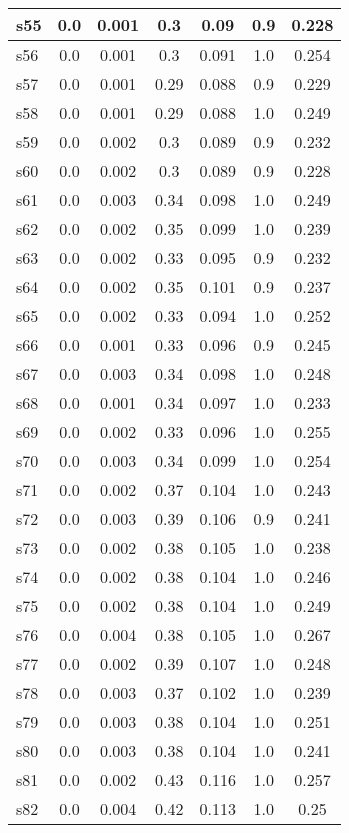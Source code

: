 \documentclass{article}
\begin{document}
\begin{tabular}{|l|c|c|c|c|c|c|}
\hline
s55 &0.0 & 0.001 & 0.3 & 0.09 & 0.9 & 0.228\\
\hline
s56 &0.0 & 0.001 & 0.3 & 0.091 & 1.0 & 0.254\\
\hline
s57 &0.0 & 0.001 & 0.29 & 0.088 & 0.9 & 0.229\\
\hline
s58 &0.0 & 0.001 & 0.29 & 0.088 & 1.0 & 0.249\\
\hline
s59 &0.0 & 0.002 & 0.3 & 0.089 & 0.9 & 0.232\\
\hline
s60 &0.0 & 0.002 & 0.3 & 0.089 & 0.9 & 0.228\\
\hline
s61 &0.0 & 0.003 & 0.34 & 0.098 & 1.0 & 0.249\\
\hline
s62 &0.0 & 0.002 & 0.35 & 0.099 & 1.0 & 0.239\\
\hline
s63 &0.0 & 0.002 & 0.33 & 0.095 & 0.9 & 0.232\\
\hline
s64 &0.0 & 0.002 & 0.35 & 0.101 & 0.9 & 0.237\\
\hline
s65 &0.0 & 0.002 & 0.33 & 0.094 & 1.0 & 0.252\\
\hline
s66 &0.0 & 0.001 & 0.33 & 0.096 & 0.9 & 0.245\\
\hline
s67 &0.0 & 0.003 & 0.34 & 0.098 & 1.0 & 0.248\\
\hline
s68 &0.0 & 0.001 & 0.34 & 0.097 & 1.0 & 0.233\\
\hline
s69 &0.0 & 0.002 & 0.33 & 0.096 & 1.0 & 0.255\\
\hline
s70 &0.0 & 0.003 & 0.34 & 0.099 & 1.0 & 0.254\\
\hline
s71 &0.0 & 0.002 & 0.37 & 0.104 & 1.0 & 0.243\\
\hline
s72 &0.0 & 0.003 & 0.39 & 0.106 & 0.9 & 0.241\\
\hline
s73 &0.0 & 0.002 & 0.38 & 0.105 & 1.0 & 0.238\\
\hline
s74 &0.0 & 0.002 & 0.38 & 0.104 & 1.0 & 0.246\\
\hline
s75 &0.0 & 0.002 & 0.38 & 0.104 & 1.0 & 0.249\\
\hline
s76 &0.0 & 0.004 & 0.38 & 0.105 & 1.0 & 0.267\\
\hline
s77 &0.0 & 0.002 & 0.39 & 0.107 & 1.0 & 0.248\\
\hline
s78 &0.0 & 0.003 & 0.37 & 0.102 & 1.0 & 0.239\\
\hline
s79 &0.0 & 0.003 & 0.38 & 0.104 & 1.0 & 0.251\\
\hline
s80 &0.0 & 0.003 & 0.38 & 0.104 & 1.0 & 0.241\\
\hline
s81 &0.0 & 0.002 & 0.43 & 0.116 & 1.0 & 0.257\\
\hline
s82 &0.0 & 0.004 & 0.42 & 0.113 & 1.0 & 0.25\\

\end{tabular}
\end{document}
